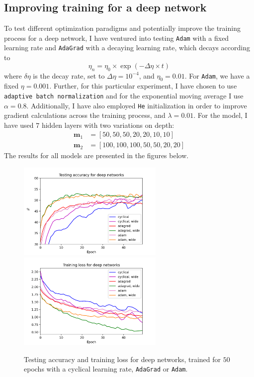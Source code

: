 \documentclass{article}
\begin{document}
\newpage
\subsection*{Improving training for a deep network}
	To test different optimization paradigms and potentially improve the training process for a deep network, I have ventured into testing \texttt{Adam} with a fixed learning rate and \texttt{AdaGrad} with a decaying learning rate, which decays according to
	$$\eta_n = \eta_0 \times \exp(-\Delta\eta \times t)$$
	where $\delta\eta$ is the decay rate, set to $\Delta\eta = 10^{-4}$, and $\eta_0 = 0.01$. For \texttt{Adam}, we have a fixed $\eta = 0.001$. Further, for this particular experiment, I have chosen to use \texttt{adaptive batch normalization} and for the exponential moving average I use $\alpha = 0.8$. Additionally, I have also employed \texttt{He} initialization in order to improve gradient calculations across the training process, and $\lambda = 0.01$. For the model, I have used $7$ hidden layers with two variations on depth:
	\begin{align*}
		\bm{m}_1 &= [50, 50, 50, 20, 20, 10, 10] \\
		\bm{m}_2 &= [100, 100, 100, 50, 50, 20, 20]
	\end{align*}
	The results for all models are presented in the figures below.
	\begin{figure}[h!]
		\centering
		\includegraphics[width=7cm]{../plots/acc_comp_deep.png}
		\includegraphics[width=7cm]{../plots/loss_comp_deep.png}	
		\caption{Testing accuracy and training loss for deep networks, trained for $50$ epochs with a cyclical learning rate, \texttt{AdaGrad} or \texttt{Adam}.}
 	\end{figure}\\
\end{document}
